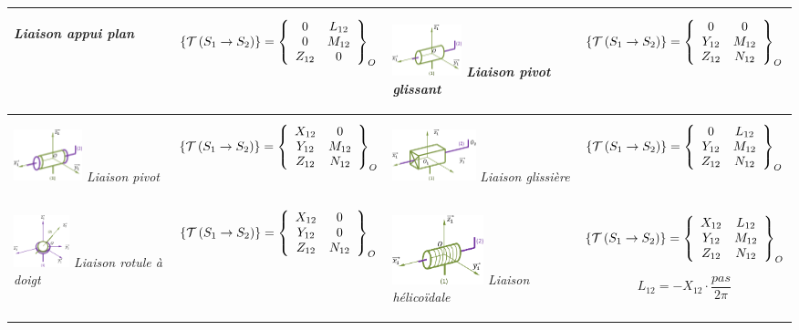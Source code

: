 \documentclass[10pt]{article}
\begin{document}
\begin{center}
\begin{tabular}{|p{}|p{}||p{}|p{}|}
\begin{center}
\textit{Liaison appui plan} 
\end{center}&
$$
\torseurstat{T}{S_1}{S_2}
=\torseurcol{0}{0}{Z_{12}}{L_{12}}{M_{12}}{0}{O}
$$
&
\begin{center}
\includegraphics[height=1.5cm]{images/pivotg}
\textit{Liaison pivot glissant} 
\end{center}&
$$
\torseurstat{T}{S_1}{S_2}
=\torseurcol{0}{Y_{12}}{Z_{12}}{0}{M_{12}}{N_{12}}{O}
$$\\\hline
\begin{center}
\includegraphics[height=1.5cm]{images/pivot}
\textit{Liaison pivot} 
\end{center}&
$$
\torseurstat{T}{S_1}{S_2}
=\torseurcol{X_{12}}{Y_{12}}{Z_{12}}{0}{M_{12}}{N_{12}}{O}
$$
&
\begin{center}
\includegraphics[height=1.5cm]{images/glissiere}
\textit{Liaison glissière} 
\end{center}&
$$
\torseurstat{T}{S_1}{S_2}
=\torseurcol{0}{Y_{12}}{Z_{12}}{L_{12}}{M_{12}}{N_{12}}{O}
$$\\\hline
\begin{center}
\includegraphics[height=1.5cm]{images/rotuled}
\textit{Liaison rotule à doigt} 
\end{center}&
$$
\torseurstat{T}{S_1}{S_2}
=\torseurcol{X_{12}}{Y_{12}}{Z_{12}}{0}{0}{N_{12}}{O}
$$
&
\begin{center}
\includegraphics[height=2cm]{images/helico}
\textit{Liaison hélicoïdale} 
\end{center}&
$$
\torseurstat{T}{S_1}{S_2}
=\torseurcol{X_{12}}{Y_{12}}{Z_{12}}{L_{12}}{M_{12}}{N_{12}}{O}
$$

$$L_{12}=-X_{12}\cdot\dfrac{pas}{2\pi}$$
\\\hline
\end{tabular}
\end{center}
\end{document}
